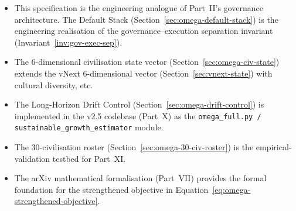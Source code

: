 \begin{itemize}
\item This specification is the engineering analogue of Part~II's
governance architecture. The Default Stack
(Section~\ref{sec:omega-default-stack}) is the engineering
realisation of the governance--execution separation invariant
(Invariant~\ref{inv:gov-exec-sep}).
\item The 6-dimensional civilisation state vector
(Section~\ref{sec:omega-civ-state}) extends the vNext 6-dimensional
vector (Section~\ref{sec:vnext-state}) with cultural diversity, etc.
\item The Long-Horizon Drift Control
(Section~\ref{sec:omega-drift-control}) is implemented in the v2.5
codebase (Part~X) as the
\texttt{omega\_full.py / sustainable\_growth\_estimator} module.
\item The 30-civilisation roster
(Section~\ref{sec:omega-30-civ-roster}) is the empirical-validation
testbed for Part~XI.
\item The arXiv mathematical formalisation (Part~VII) provides the
formal foundation for the strengthened objective in
Equation~\ref{eq:omega-strengthened-objective}.
\end{itemize}
